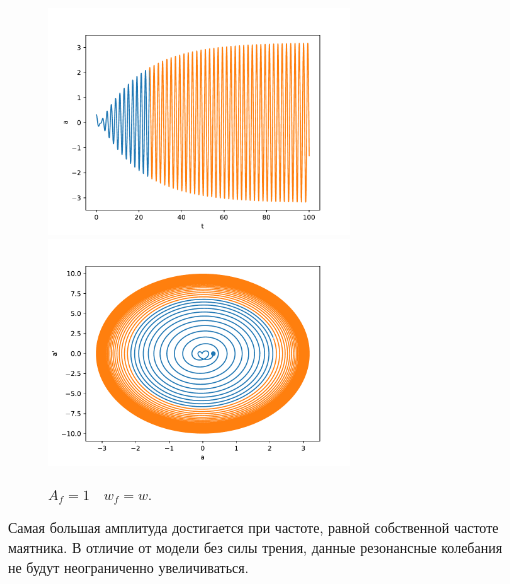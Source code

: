             \begin{figure}[H]
                \centering
                \includegraphics[width=8cm]{pictures/5resonance3.pdf}
                \includegraphics[width=8cm]{pictures/5resonance3p.pdf}
                \caption{$A_f = 1 \quad w_f = w$.}
            \end{figure}
            Самая большая амплитуда достигается при частоте, равной собственной частоте маятника. В отличие от модели без силы трения, данные резонансные колебания не будут неограниченно увеличиваться. 

